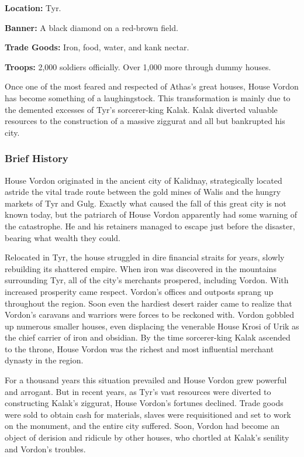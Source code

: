 \textbf{Location:} Tyr.

\textbf{Banner:} A black diamond on a red-brown field.

\textbf{Trade Goods:} Iron, food, water, and kank nectar.

\textbf{Troops:} 2,000 soldiers officially. Over 1,000 more through dummy houses.

Once one of the most feared and respected of Athas's great houses, House Vordon has become something of a laughingstock. This transformation is mainly due to the demented excesses of Tyr's sorcerer-king Kalak. Kalak diverted valuable resources to the construction of a massive ziggurat and all but bankrupted his city.

\subsubsection{Brief History}
House Vordon originated in the ancient city of Kalidnay, strategically located astride the vital trade route between the gold mines of Walis and the hungry markets of Tyr and Gulg. Exactly what caused the fall of this great city is not known today, but the patriarch of House Vordon apparently had some warning of the catastrophe. He and his retainers managed to escape just before the disaster, bearing what wealth they could.

Relocated in Tyr, the house struggled in dire financial straits for years, slowly rebuilding its shattered empire. When iron was discovered in the mountains surrounding Tyr, all of the city's merchants prospered, including Vordon. With increased prosperity came respect. Vordon's offices and outposts sprang up throughout the region. Soon even the hardiest desert raider came to realize that Vordon's caravans and warriors were forces to be reckoned with. Vordon gobbled up numerous smaller houses, even displacing the venerable House Krosi of Urik as the chief carrier of iron and obsidian. By the time sorcerer-king Kalak ascended to the throne, House Vordon was the richest and most influential merchant dynasty in the region.

For a thousand years this situation prevailed and House Vordon grew powerful and arrogant. But in recent years, as Tyr's vast resources were diverted to constructing Kalak's ziggurat, House Vordon's fortunes declined. Trade goods were sold to obtain cash for materials, slaves were requisitioned and set to work on the monument, and the entire city suffered. Soon, Vordon had become an object of derision and ridicule by other houses, who chortled at Kalak's senility and Vordon's troubles.

